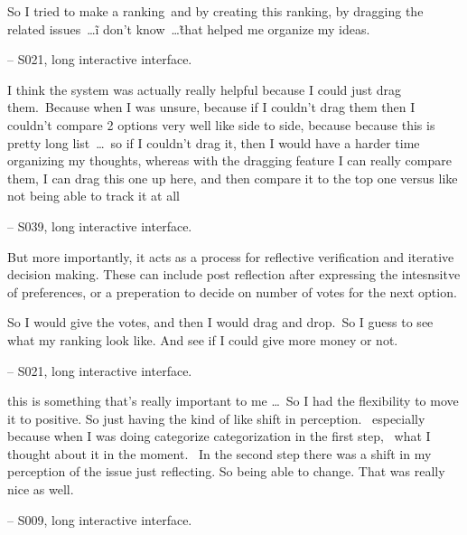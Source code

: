 \begin{displayquote}
So I tried to make a ranking~\bracketellipsis and by creating this ranking, by dragging the related issues~\ldots\~i don’t know~\ldots\~that helped me organize my ideas.
    
\noindent \hfill -- S021, long interactive interface.
\end{displayquote}

\begin{displayquote}
I think the system was actually really helpful because I could just drag them.~\bracketellipsis Because when I was unsure, because if I couldn't drag them then I couldn't compare 2 options very well like side to side, because because this is pretty long list~\ldots\ so if I couldn't drag it, then I would have a harder time organizing my thoughts, whereas  with the dragging feature I can really compare them, I can drag this one up here, and then compare it to the top one versus like not being able to track it at all
    
\noindent \hfill -- S039, long interactive interface.
\end{displayquote}


But more importantly, it acts as a process for reflective verification and iterative decision making. These can include post reflection after expressing the intesnsitve of preferences, or a preperation to decide on number of votes for the next option.


\begin{displayquote}
So I would give the votes, and then I would drag and drop.~\bracketellipsis So I guess to see what my ranking look like. And see if I could give more money or not.
    
\noindent \hfill -- S021, long interactive interface.
\end{displayquote}

\begin{displayquote}
\bracketellipsis this is something that's really important to me \ldots\ So I had the flexibility to move it to positive. So just having the kind of like shift in perception. ~\bracketellipsis especially because when I was doing categorize categorization in the first step, ~\bracketellipsis what I thought about it in the moment. ~\bracketellipsis In the second step there was a shift in my perception of the issue just reflecting. So being able to change. That was really nice as well. 

\noindent \hfill -- S009, long interactive interface.
\end{displayquote}

